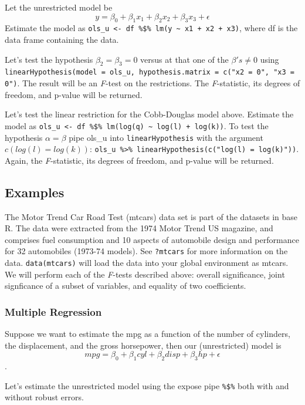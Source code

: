 \documentclass[]{book}
\begin{document}
Let the unrestricted model be \[y=\beta_0+\beta_1x_1+\beta_2x_2+\beta_3x_3+\epsilon\] Estimate the model as \texttt{ols\_u\ \textless{}-\ df\ \%\$\%\ lm(y\ \textasciitilde{}\ x1\ +\ x2\ +\ x3)}, where df is the data frame containing the data.

Let's test the hypothesis \(\beta_2=\beta_3=0\) versus at that one of the \(\beta's\ne0\) using \texttt{linearHypothesis(model\ =\ ols\_u,\ hypothesis.matrix\ =\ c("x2\ =\ 0",\ "x3\ =\ 0")}. The result will be an \emph{F}-test on the restrictions. The \emph{F}-statistic, its degrees of freedom, and p-value will be returned.

Let's test the linear restriction for the Cobb-Douglas model above. Estimate the model as \texttt{ols\_u\ \textless{}-\ df\ \%\$\%\ lm(log(q)\ \textasciitilde{}\ log(l)\ +\ log(k))}. To test the hypothesis \(\alpha=\beta\) pipe ols\_u into \texttt{linearHypothesis} with the argument \(c(log(l) = log(k))\): \texttt{ols\_u\ \%\textgreater{}\%\ linearHypothesis(c("log(l)\ =\ log(k)"))}. Again, the \emph{F}-statistic, its degrees of freedom, and p-value will be returned.

\hypertarget{examples}{%
\subsection{Examples}\label{examples}}

The Motor Trend Car Road Test (mtcars) data set is part of the datasets in base R. The data were extracted from the 1974 Motor Trend US magazine, and comprises fuel consumption and 10 aspects of automobile design and performance for 32 automobiles (1973-74 models). See \texttt{?mtcars} for more information on the data. \texttt{data(mtcars)} will load the data into your global environment as mtcars. We will perform each of the \emph{F}-tests described above: overall significance, joint signficance of a subset of variables, and equality of two coefficients.

\hypertarget{multiple-regression-1}{%
\subsubsection{Multiple Regression}\label{multiple-regression-1}}

Suppose we want to estimate the mpg as a function of the number of cylinders, the displacement, and the gross horsepower, then our (unrestricted) model is \[mpg=\beta_0+\beta_1cyl+\beta_2disp+\beta_3hp+\epsilon\].

Let's estimate the unrestricted model using the expose pipe \texttt{\%\$\%} both with and without robust errors.
\end{document}
